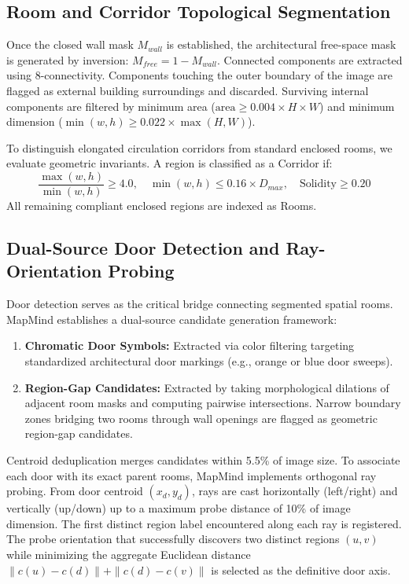 \documentclass[conference]{IEEEtran}
\begin{document}
\subsection{Room and Corridor Topological Segmentation}
Once the closed wall mask $M_{wall}$ is established, the architectural free-space mask is generated by inversion: $M_{free} = 1 - M_{wall}$. Connected components are extracted using 8-connectivity. Components touching the outer boundary of the image are flagged as external building surroundings and discarded. Surviving internal components are filtered by minimum area ($\text{area} \ge 0.004 \times H \times W$) and minimum dimension ($\min(w, h) \ge 0.022 \times \max(H, W)$).

To distinguish elongated circulation corridors from standard enclosed rooms, we evaluate geometric invariants. A region is classified as a Corridor if:
\begin{equation}
\frac{\max(w, h)}{\min(w, h)} \ge 4.0, \quad \min(w, h) \le 0.16 \times D_{max}, \quad \text{Solidity} \ge 0.20
\end{equation}
All remaining compliant enclosed regions are indexed as Rooms.

\subsection{Dual-Source Door Detection and Ray-Orientation Probing}
Door detection serves as the critical bridge connecting segmented spatial rooms. MapMind establishes a dual-source candidate generation framework:
\begin{enumerate}
    \item \textbf{Chromatic Door Symbols:} Extracted via color filtering targeting standardized architectural door markings (e.g., orange or blue door sweeps).
    \item \textbf{Region-Gap Candidates:} Extracted by taking morphological dilations of adjacent room masks and computing pairwise intersections. Narrow boundary zones bridging two rooms through wall openings are flagged as geometric region-gap candidates.
\end{enumerate}
Centroid deduplication merges candidates within 5.5\% of image size. To associate each door with its exact parent rooms, MapMind implements orthogonal ray probing. From door centroid $(x_d, y_d)$, rays are cast horizontally (left/right) and vertically (up/down) up to a maximum probe distance of 10\% of image dimension. The first distinct region label encountered along each ray is registered. The probe orientation that successfully discovers two distinct regions $(u, v)$ while minimizing the aggregate Euclidean distance $\|c(u) - c(d)\| + \|c(d) - c(v)\|$ is selected as the definitive door axis.
\end{document}
